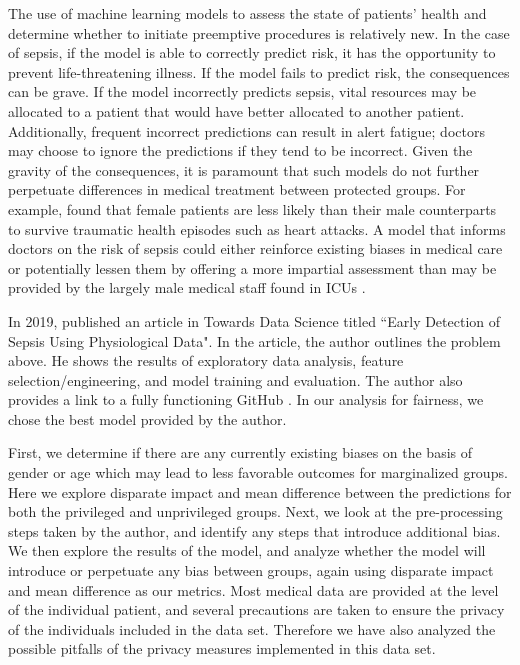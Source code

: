 \documentclass[10pt,letterpaper]{article}
\begin{document}
\par The use of machine learning models to assess the state of patients' health and determine whether to initiate preemptive procedures is relatively new. In the case of sepsis, if the model is able to correctly predict risk, it has the opportunity to prevent life-threatening illness. If the model fails to predict risk, the consequences can be grave. If the model incorrectly predicts sepsis, vital resources may be allocated to a patient that would have better allocated to another patient. Additionally, frequent incorrect predictions can result in alert fatigue; doctors may choose to ignore the predictions if they tend to be incorrect.  Given the gravity of the consequences, it is paramount that such models do not further perpetuate differences in medical treatment between protected groups. For example, \citeauthor{Greenwood2018} found that female patients are less likely than their male counterparts to survive traumatic health episodes such as heart attacks. A model that informs doctors on the risk of sepsis could either reinforce existing biases in medical care or potentially lessen them by offering a more impartial assessment than may be provided by the largely male medical staff found in ICUs \cite{Chadwick2020}.

\par In 2019, \citeauthor{Sindwani2019} published an article in Towards Data Science titled “Early Detection of Sepsis Using Physiological Data". In the article, the author outlines the problem above. He shows the results of exploratory data analysis, feature selection/engineering, and model training and evaluation. The author also provides a link to a fully functioning GitHub \cite{Karan2019}. In our analysis for fairness, we chose the best model provided by the author. 

\par First, we determine if there are any currently existing biases on the basis of gender or age which may lead to less favorable outcomes for marginalized groups. Here we explore disparate impact and mean difference between the predictions for both the privileged and unprivileged groups. Next, we look at the pre-processing steps taken by the author, and identify any steps that introduce additional bias. We then explore the results of the model, and analyze whether the model will introduce or perpetuate any bias between groups, again using disparate impact and mean difference as our metrics. Most medical data are provided at the level of the individual patient, and several precautions are taken to ensure the privacy of the individuals included in the data set. Therefore we have also analyzed the possible pitfalls of the privacy measures implemented in this data set.
\end{document}
